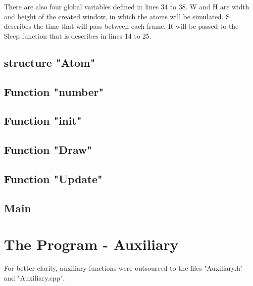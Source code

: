 \documentclass[11pt,titlepage]{article}
\def\ContinueLineNumber{\lstset{firstnumber=last}}
\begin{document}
			There are also four global variables defined in lines 34 to 38. W and H are width and height of the created window, in which the atoms will be simulated.
			S describes the time that will pass between each frame. It will be passed to the Sleep function that is describes in lines 14 to 25.
			
			
			
		\subsection{structure "Atom"}	
			\ContinueLineNumber
			
			
		\subsection{Function "number"}
			\ContinueLineNumber
			
			
		\subsection{Function "init"}
			\ContinueLineNumber
			
			
		\subsection{Function "Draw"}
			\ContinueLineNumber
			
			
		\subsection{Function "Update"}
			\ContinueLineNumber
			
			
		\subsection{Main}
			\ContinueLineNumber
			
			
\newpage			
		\section{The Program - Auxiliary}
		For better clarity, auxiliary functions were outsourced to the files 
		"Auxiliary.h" and "Auxiliary.cpp".
\end{document}
